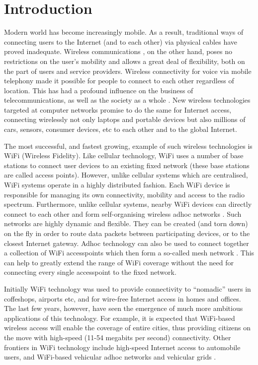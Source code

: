 \documentclass{elsart}
\begin{document}
\section{Introduction}
Modern world has become increasingly mobile. As a result, traditional 
ways of connecting users to the Internet (and to each other) 
via physical cables have proved inadequate. Wireless communications
\cite{wicom}, on the other hand,  poses no restrictions on the user's mobility and allows a great deal 
of flexibility, both  on the part of users and service providers. 
Wireless connectivity for 
voice via mobile telephony made it possible for people to connect to each 
other regardless of location. This  has had a profound influence on
the business of telecommunications, as well as the society as a whole
\cite{economist1}. New  wireless technologies targeted at computer networks promise to do the same for Internet access, connecting wirelessly not only laptops and portable devices but also  millions of cars, sensors, consumer devices, etc to each other and 
to the global Internet.

The most successful, and fastest growing, example of such wireless 
technologies is WiFi (Wireless Fidelity)\cite{wifi}.
Like cellular technology, WiFi uses a number of base stations to 
connect user devices to an existing fixed network (these base stations
are called access points). However, unlike cellular
systems which are centralised, WiFi systems operate in a highly
distributed fashion. Each WiFi device is responsible for 
managing its own connectivity, mobility and access to the radio spectrum.
Furthermore, unlike cellular systems, nearby WiFi devices can directly connect
to each other and form  self-organising wireless adhoc
networks \cite{adhoc1, adhoc2}. Such networks are highly dynamic and flexible. 
They can be created (and torn down) 
on the fly in order to route data packets between participating devices, 
or to the closest Internet gateway. Adhoc technology can also be used to 
connect together a collection of WiFi accesspoints which then form a so-called 
mesh network \cite{mesh}.
This can help to greatly extend the range of WiFi coverage without 
the need for connecting every single accesspoint to the fixed network.

Initially WiFi technology was used 
to provide connectivity to ``nomadic'' users in coffeshops, 
airports etc, and for wire-free Internet access in homes and offices.
The last few years, however, have seen the emergence of much more ambitious 
applications of this technology.
For example, it is expected that WiFi-based 
wireless access will enable the coverage of entire cities, thus providing 
citizens on the move with high-speed (11-54 megabits per second) 
connectivity. Other frontiers in WiFi technology include 
high-speed Internet access to automobile users, 
and WiFi-based vehicular adhoc networks and vehicular grids 
\cite{maziar-vgrid}. 
\end{document}
